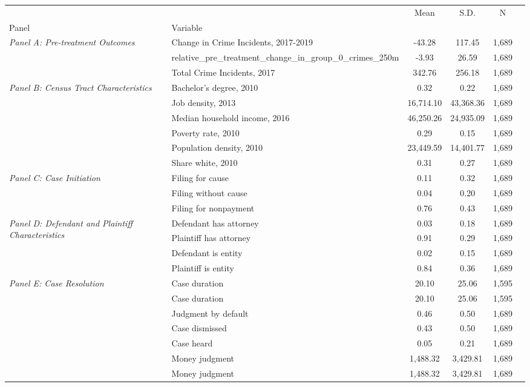 \begin{tabular}{llcccc}
\toprule
 &  & Mean & S.D. & N \\
Panel & Variable &  &  &  \\
\midrule
\multirow[c]{3}{4cm}{\textit{Panel A: Pre-treatment Outcomes}} & Change in Crime Incidents, 2017-2019 & -43.28 & 117.45 & 1,689 \\
 & relative_pre_treatment_change_in_group_0_crimes_250m & -3.93 & 26.59 & 1,689 \\
 & Total Crime Incidents, 2017 & 342.76 & 256.18 & 1,689 \\
\cline{1-5}
\multirow[c]{6}{4cm}{\textit{Panel B: Census Tract Characteristics}} & Bachelor's degree, 2010 & 0.32 & 0.22 & 1,689 \\
 & Job density, 2013 & 16,714.10 & 43,368.36 & 1,689 \\
 & Median household income, 2016 & 46,250.26 & 24,935.09 & 1,689 \\
 & Poverty rate, 2010 & 0.29 & 0.15 & 1,689 \\
 & Population density, 2010 & 23,449.59 & 14,401.77 & 1,689 \\
 & Share white, 2010 & 0.31 & 0.27 & 1,689 \\
\cline{1-5}
\multirow[c]{3}{4cm}{\textit{Panel C: Case Initiation}} & Filing for cause & 0.11 & 0.32 & 1,689 \\
 & Filing without cause & 0.04 & 0.20 & 1,689 \\
 & Filing for nonpayment & 0.76 & 0.43 & 1,689 \\
\cline{1-5}
\multirow[c]{4}{4cm}{\textit{Panel D: Defendant and Plaintiff Characteristics}} & Defendant has attorney & 0.03 & 0.18 & 1,689 \\
 & Plaintiff has attorney & 0.91 & 0.29 & 1,689 \\
 & Defendant is entity & 0.02 & 0.15 & 1,689 \\
 & Plaintiff is entity & 0.84 & 0.36 & 1,689 \\
\cline{1-5}
\multirow[c]{7}{4cm}{\textit{Panel E: Case Resolution}} & Case duration & 20.10 & 25.06 & 1,595 \\
 & Case duration & 20.10 & 25.06 & 1,595 \\
 & Judgment by default & 0.46 & 0.50 & 1,689 \\
 & Case dismissed & 0.43 & 0.50 & 1,689 \\
 & Case heard & 0.05 & 0.21 & 1,689 \\
 & Money judgment & 1,488.32 & 3,429.81 & 1,689 \\
 & Money judgment & 1,488.32 & 3,429.81 & 1,689 \\
\cline{1-5}
\bottomrule
\end{tabular}

